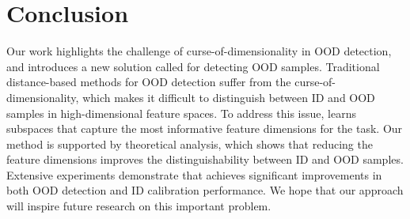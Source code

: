 \section{Conclusion}
\label{sec:conclusion}

Our work highlights the challenge of curse-of-dimensionality in OOD detection, and introduces a new solution called \name for detecting OOD samples. Traditional distance-based methods for OOD detection suffer from the curse-of-dimensionality, which makes it difficult to distinguish between ID and OOD samples in high-dimensional feature spaces. To address this issue, \name learns subspaces that capture the most informative feature dimensions for the task. Our method is supported by theoretical analysis, which shows that reducing the feature dimensions improves the distinguishability between ID and OOD samples. Extensive experiments demonstrate that \name achieves significant improvements in both OOD detection and ID calibration performance. We hope that our approach will inspire future research on this important problem.

